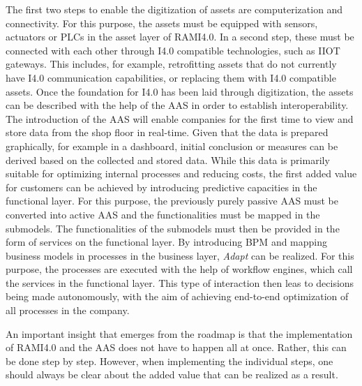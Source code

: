 The first two steps to enable the digitization of assets are computerization and connectivity. For this purpose, the assets must be equipped with sensors, actuators or PLCs in the asset layer of \ac{RAMI4.0}. In a second step, these must be connected with each other through \ac{I4.0} compatible technologies, such as \ac{IIOT} gateways. This includes, for example, retrofitting assets that do not currently have \ac{I4.0} communication capabilities, or replacing them with \ac{I4.0} compatible assets. Once the foundation for \ac{I4.0} has been laid through digitization, the assets can be described with the help of the \ac{AAS} in order to establish interoperability. The introduction of the \ac{AAS} will enable companies for the first time to view and store data from the shop floor in real-time. Given that the data is prepared graphically, for example in a dashboard, initial conclusion or measures can be derived based on the collected and stored data. While this data is primarily suitable for optimizing internal processes and reducing costs, the first added value for customers can be achieved by introducing predictive capacities in the functional layer. For this purpose, the previously purely passive \ac{AAS} must be converted into active \ac{AAS} and the functionalities must be mapped in the submodels. The functionalities of the submodels must then be provided in the form of services on the functional layer. By introducing \ac{BPM} and mapping business models in processes in the business layer, \textit{Adapt} can be realized. For this purpose, the processes are executed with the help of workflow engines, which call the services in the functional layer. This type of interaction then leas to decisions being made autonomously, with the aim of achieving end-to-end optimization of all processes in the company. 

An important insight that emerges from the roadmap is that the implementation of \ac{RAMI4.0} and the \ac{AAS} does not have to happen all at once. Rather, this can be done step by step. However, when implementing the individual steps, one should always be clear about the added value that can be realized as a result.